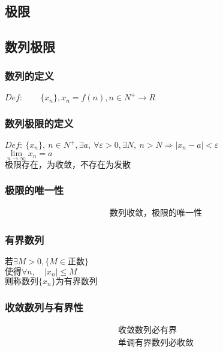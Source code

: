 \begin{center}\section{ 极限}\label{chapter_limit}\end{center}
\subsection{数列极限}
\subsubsection{数列的定义}
\begin{center}
$Def:\qquad \{x_n\},x_n = f(n),n\in N^+\rightarrow R $
\end{center}
\subsubsection{数列极限的定义}
$Def:\ \{x_n\},\ n\in N^+,\exists  a,\ \forall\varepsilon>0,\exists N,\ n>N\Rightarrow \left|x_n-a\right|<\varepsilon$\\
$\lim\limits_{n \to \infty}{x_n}=a$\\ 
$\mbox{极限存在，为收敛，不存在为发散}$
\subsubsection{极限的唯一性}
\begin{align}
\mbox{数列收敛，极限的唯一性}\label{limit_sequence}
\end{align}
\subsubsection{有界数列}
\begin{center}
    $\mbox{若}\exists M>0,\{M\in\mbox{正数}\}$\\
    $\mbox{使得}\forall n,\quad\left|x_n\right|\leqslant M$\\
    $\mbox{则称数列$\{x_n\}$为有界数列}$
\end{center}
\subsubsection{收敛数列与有界性}
\begin{align}
    \mbox{收敛数列必有界}\label{sequence_bounded_1}\\
    \mbox{单调有界数列必收敛}\label{sequence_bounded_2}
\end{align}
